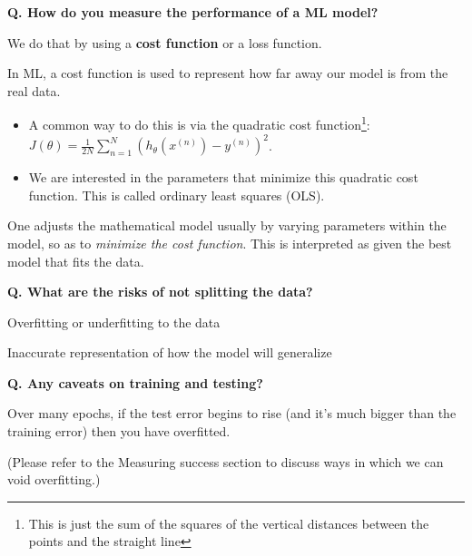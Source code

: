 \begin{frame}[fragile]{\textbf{Q. How do you measure the performance of a ML model?}}
  \begin{wideitemize}
    \item We do that by using a \textbf{cost function} or a loss function.
    \item In ML, a cost function is used to represent how far away our model is from the real data.
    \begin{itemize}
      \item A common way to do this is via the quadratic cost function\footnote{This is
      just the sum of the squares of the vertical distances between the points and the straight line}:\vspace{.4em}
      $J(\theta) = \frac{1}{2N}\sum^{N}_{n=1}(h_{\theta}(x^{(n)}) - y^{(n)})^{2}$.\vspace{.4em}
      \item We are interested in the parameters that minimize this quadratic cost function.
      This is called ordinary least squares (OLS).
    \end{itemize}
    \item One adjusts the mathematical model usually by varying parameters within the model, so as
    to \textit{minimize the cost function}. This is interpreted as given the best model that fits the data.
  \end{wideitemize}
\end{frame}

\begin{frame}[fragile]{\textbf{Q. What are the risks of not splitting the data?}}
  \begin{wideitemize}
    \item Overfitting or underfitting to the data
    \item Inaccurate representation of how the model will generalize
  \end{wideitemize}
\end{frame}

\begin{frame}[fragile]{\textbf{Q. Any caveats on training and testing?}}
  \begin{wideitemize}
    \item Over many epochs, if the test error begins to rise (and it's much
    bigger than the training error) then you have overfitted.
    \item (Please refer to the Measuring success section to discuss ways in
    which we can void overfitting.)
  \end{wideitemize}
\end{frame}

